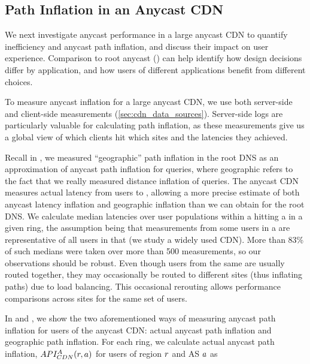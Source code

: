 \documentclass[sigconf,letterpaper,nonacm,10pt,anonymous]{acmart}
\begin{document}
\subsection{Path Inflation in an Anycast
CDN}\label{path-inflation-in-an-anycast-cdn}

\label{sec:cdn_anycast} We next investigate anycast performance in a
large anycast CDN to quantify inefficiency and anycast path inflation,
and discuss their impact on user experience. Comparison to root anycast
() can help identify how design decisions
differ by application, and how users of different applications benefit
from different choices.

To measure anycast inflation for a large anycast CDN, we use both
server-side and client-side measurements (\cref{sec:cdn_data_sources}).
Server-side logs are particularly valuable for calculating path
inflation, as these measurements give us a global view of which clients
hit which \fe sites and the latencies they achieved.

Recall in , we measured ``geographic'' path
inflation in the root DNS as an approximation of anycast path inflation
for queries, where geographic refers to the fact that we really measured
distance inflation of queries. The anycast CDN measures actual latency
from users to \feplural, allowing a more precise estimate of both
anycast latency inflation and geographic inflation than we can obtain
for the root DNS. We calculate median latencies over user populations
within a \metroas hitting a \fe in a given ring, the assumption being
that measurements from some users in a \metroas are representative of
all users in that \metroas (we study a widely used CDN). More than 83\%
of such medians were taken over more than 500 measurements, so our
observations should be robust. Even though users from the same
\metroas are usually routed together, they may occasionally be routed to
different sites (thus inflating paths) due to load balancing. This
occasional rerouting allows performance comparisons across sites for the
same set of users.

In  and
, we show the two aforementioned
ways of measuring anycast path inflation for users of the anycast CDN:
actual anycast path inflation and geographic path inflation. For each
ring, we calculate actual anycast path inflation,
\(\mathnormal{API^A_{CDN}(r,a)}\) for users of region \(\mathnormal{r}\)
and AS \(\mathnormal{a}\) as
\end{document}
